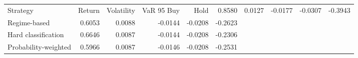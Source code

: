 \begin{tabular}{lrrrrr}
\toprule
Strategy & Return & Volatility & VaR 95%
\midrule
Buy & Hold & 0.8580 & 0.0127 & -0.0177 & -0.0307 & -0.3943 \\
Regime-based & 0.6053 & 0.0088 & -0.0144 & -0.0208 & -0.2623 \\
Hard classification & 0.6646 & 0.0087 & -0.0144 & -0.0208 & -0.2306 \\
Probability-weighted & 0.5966 & 0.0087 & -0.0146 & -0.0208 & -0.2531 \\
\bottomrule
\end{tabular}
